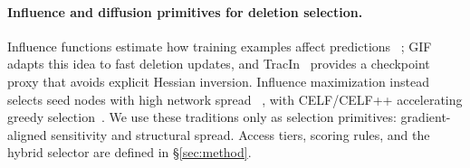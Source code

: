 \paragraph{Influence and diffusion primitives for deletion selection.}
Influence functions estimate how training examples affect predictions
~\cite{koh2017understanding}; GIF~\cite{wu2023gif} adapts this idea to
fast deletion updates, and TracIn~\cite{pruthi2020estimating} provides a
checkpoint proxy that avoids explicit Hessian inversion. Influence
maximization instead selects seed nodes with high network spread
~\cite{kempe2003maximizing}, with CELF/CELF++ accelerating greedy
selection~\cite{leskovec2007cost,goyal2011celf++}. We use these
traditions only as selection primitives: gradient-aligned sensitivity
and structural spread. Access tiers, scoring rules, and the hybrid
selector are defined in \S\ref{sec:method}.
